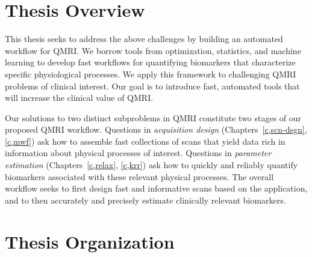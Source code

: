 \section{Thesis Overview}
\label{s,intro,over}

This thesis seeks
to address the above challenges
by building an automated workflow for QMRI.
We borrow tools
from optimization, statistics, and machine learning
to develop fast workflows
for quantifying biomarkers
that characterize specific physiological processes. 
We apply this framework
to challenging QMRI problems 
of clinical interest.
Our goal is to introduce fast, automated tools
that will increase the clinical value of QMRI.

Our solutions to two distinct subproblems in QMRI
constitute two stages of our proposed QMRI workflow.
Questions in \emph{acquisition design}
(Chapters~\ref{c,scn-dsgn}, \ref{c,mwf})
ask how to assemble 
fast collections of scans
that yield data 
rich in information 
about physical processes of interest.
Questions in \emph{parameter estimation}
(Chapters~\ref{c,relax}, \ref{c,krr})
ask how to quickly and reliably quantify biomarkers 
associated with these relevant physical processes.
The overall workflow seeks to
first design fast and informative scans 
based on the application,
and to then accurately and precisely estimate 
clinically relevant biomarkers.
 
\section{Thesis Organization}
\label{s,intro,org}

